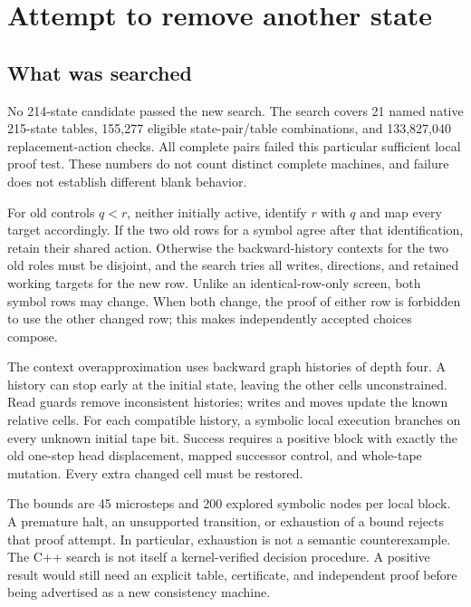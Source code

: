 \section{Attempt to remove another state}\label{sec:reduction}

\subsection{What was searched}

No 214-state candidate passed the new search. The search covers 21 named
native 215-state tables, 155,277 eligible state-pair/table combinations,
and 133,827,040 replacement-action checks. All complete pairs failed this
particular sufficient local proof test. These numbers do not count distinct
complete machines, and failure does not establish different blank behavior.

For old controls \(q<r\), neither initially active, identify \(r\) with \(q\)
and map every target accordingly. If the two old rows for a symbol agree
after that identification, retain their shared action. Otherwise the
backward-history contexts for the two old roles must be disjoint, and the
search tries all writes, directions, and retained working targets for the
new row. Unlike an identical-row-only screen, both symbol rows may change.
When both change, the proof of either row is forbidden to use the other
changed row; this makes independently accepted choices compose.

The context overapproximation uses backward graph histories of depth four.
A history can stop early at the initial state, leaving the other cells
unconstrained. Read guards remove inconsistent histories; writes and
moves update the known relative cells. For each compatible history, a
symbolic local execution branches on every unknown initial tape bit.
Success requires a positive block with exactly the old one-step head
displacement, mapped successor control, and whole-tape mutation.
Every extra changed cell must be restored.

The bounds are 45 microsteps and 200 explored symbolic nodes per local
block. A premature halt, an unsupported transition, or exhaustion of a
bound rejects that proof attempt. In particular, exhaustion is not a
semantic counterexample. The C++ search is not itself a kernel-verified
decision procedure. A positive result would still need an explicit table,
certificate, and independent proof before being advertised as a new
consistency machine.

